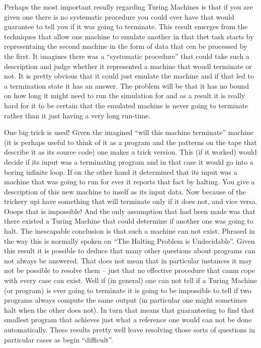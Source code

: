 Perhaps the most important resully regarding Turing Machines is that if you
are given one there is no systematic procedure you could ever have that
would guarantee to tell you if it was going to terminate. This result
emerges from the techniques that allow one machine to emulate another
in that thet task starts by representaing the second machine in the
form of data that cen be processed by the first. It imagines there was
a ``systematic procedure'' that could take such a description and judge
whether it represented a machine that woudl terminate or not. It is
pretty obvious that it could just emulate the machine and if that led
to a termination state it has an answer. The problem will be that it has
no bound on how long it might need to run the simulation for and as a
result it is really hard for it to be certain that the emulated machine
is never going to terminate rather than it just having a very long run-time.

One big trick is used! Given the imagined ``will this machine terminate''
machine (it is perhaps useful to think of it as a program and the
patterns on the tape that describe it as its source code) one
makes a trick version. This (if it worked) would decide if its input
was a terminating program and in that case it would go into a boring
infinite loop. If on the other hand it determined that its input was a
machine that was going to run for ever it reports that fact by halting.
You give a description of this new machine to inself as its input data.
Now because of the trickery upi have something that will terminate
only if it does not, and vice versa. Ooops that is impossible! And the
only assumption that had been made was that there existed a Turing Machine
that could determine if another one was going to halt. The inescapable
conclusion is that such a machine can not exist. Phrased in the way
this is normally spoken on ``The Halting Problem is Undecidable''. Given
this result it is possible to deduce that many other questions about
programs can not always be answered. That does not mean that in particular
instances it may not be possible to resolve them -- just that no
effective procedure that canm cope with every case can exist. Well if
(in general) one can not tell if a Turing Machine (or program) is ever going
to terminate it is going to be impossible to tell if two programs
always compute the same output (in particular one might sometimes halt
when the other does not). In turn that means that guaranteeing to find
that smallest program that achieves just what a reference one would can
not be done automatically. These results pretty well leave resolving those
sorts of questions in particular cases as begin ``difficult''.

